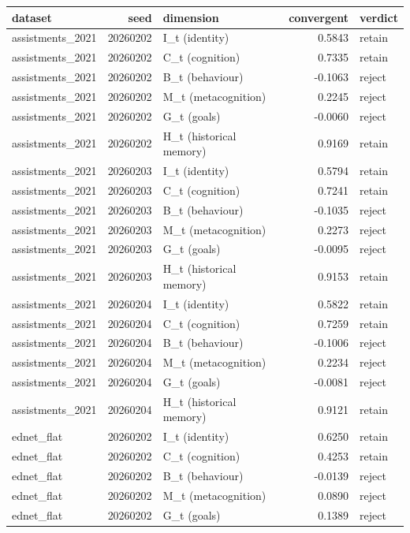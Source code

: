 \begin{tabular}{lrlrl}
\toprule
dataset & seed & dimension & convergent & verdict \\
\midrule
assistments\_2021 & 20260202 & I\_t (identity) & 0.5843 & retain \\
assistments\_2021 & 20260202 & C\_t (cognition) & 0.7335 & retain \\
assistments\_2021 & 20260202 & B\_t (behaviour) & -0.1063 & reject \\
assistments\_2021 & 20260202 & M\_t (metacognition) & 0.2245 & reject \\
assistments\_2021 & 20260202 & G\_t (goals) & -0.0060 & reject \\
assistments\_2021 & 20260202 & H\_t (historical memory) & 0.9169 & retain \\
assistments\_2021 & 20260203 & I\_t (identity) & 0.5794 & retain \\
assistments\_2021 & 20260203 & C\_t (cognition) & 0.7241 & retain \\
assistments\_2021 & 20260203 & B\_t (behaviour) & -0.1035 & reject \\
assistments\_2021 & 20260203 & M\_t (metacognition) & 0.2273 & reject \\
assistments\_2021 & 20260203 & G\_t (goals) & -0.0095 & reject \\
assistments\_2021 & 20260203 & H\_t (historical memory) & 0.9153 & retain \\
assistments\_2021 & 20260204 & I\_t (identity) & 0.5822 & retain \\
assistments\_2021 & 20260204 & C\_t (cognition) & 0.7259 & retain \\
assistments\_2021 & 20260204 & B\_t (behaviour) & -0.1006 & reject \\
assistments\_2021 & 20260204 & M\_t (metacognition) & 0.2234 & reject \\
assistments\_2021 & 20260204 & G\_t (goals) & -0.0081 & reject \\
assistments\_2021 & 20260204 & H\_t (historical memory) & 0.9121 & retain \\
ednet\_flat & 20260202 & I\_t (identity) & 0.6250 & retain \\
ednet\_flat & 20260202 & C\_t (cognition) & 0.4253 & retain \\
ednet\_flat & 20260202 & B\_t (behaviour) & -0.0139 & reject \\
ednet\_flat & 20260202 & M\_t (metacognition) & 0.0890 & reject \\
ednet\_flat & 20260202 & G\_t (goals) & 0.1389 & reject \\

\end{tabular}
